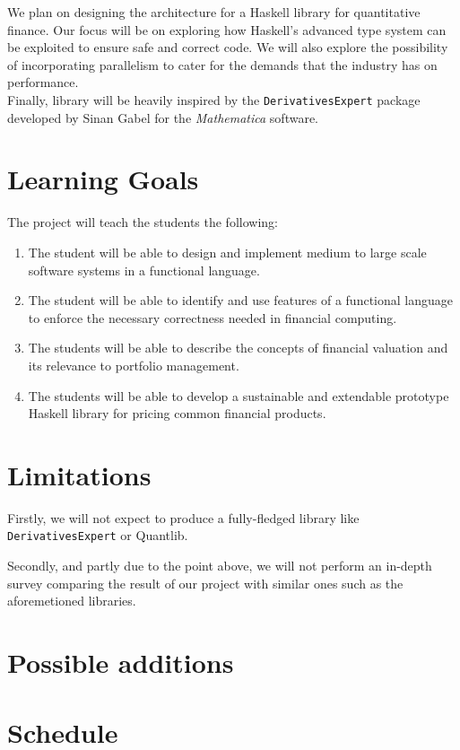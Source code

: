 \documentclass[11pt]{article}
\begin{document}
We plan on designing the architecture for a Haskell library for quantitative finance.
Our focus will be on exploring how Haskell's advanced type system can be exploited
to ensure safe and correct code.
We will also explore the possibility of incorporating parallelism to cater for the
demands that the industry has on performance.\\

Finally, library will be heavily inspired by the {\tt DerivativesExpert} package developed by Sinan Gabel for the \emph{Mathematica} software\cite{Mathematica:DerivativesExpert}.

\section*{Learning Goals}

The project will teach the students the following:

\begin{enumerate}
\item The student will be able to design and implement medium to large scale software systems in a functional language. %
\item The student will be able to identify and use features of a functional language to enforce the necessary correctness needed in financial computing. %
\item The students will be able to describe the concepts of financial valuation and its relevance to portfolio management. %
\item The students will be able to develop a sustainable and extendable prototype Haskell library for pricing common financial products. %
\end{enumerate}

\section*{Limitations}

Firstly, we will not expect to produce a fully-fledged library like {\tt DerivativesExpert} or Quantlib\cite{Ame2003}.

Secondly, and partly due to the point above, we will not perform an in-depth survey
comparing the result of our project with similar ones such as the aforemetioned libraries.



\section*{Possible additions}

\section*{Schedule}



\end{document}
